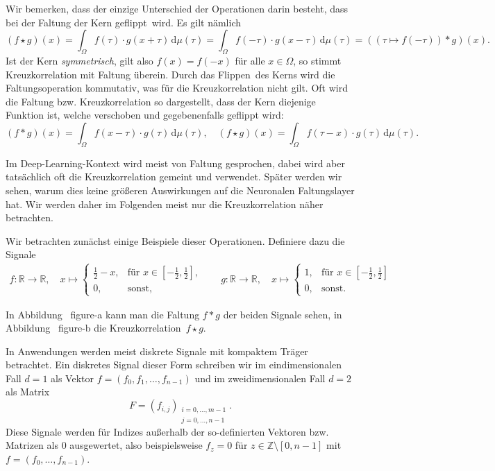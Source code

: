\documentclass{article}
\theoremstyle{definition}
\newcommand{\R}{\mathbb{R}}
\newcommand{\Z}{\mathbb{Z}}
\newcommand{\diff}{\,\textrm{d}}
\newcommand{\todo}[1]{{\color{red} #1}}
\begin{document}
Wir bemerken, dass der einzige Unterschied der Operationen darin besteht, dass bei der Faltung der Kern \glqq geflippt\grqq\ wird.
Es gilt nämlich \[
    \left(f \star g\right)(x) = \int_{\Omega} f(\tau) \cdot g(x+\tau) \diff\mu(\tau) = \int_\Omega f(-\tau) \cdot g(x - \tau) \diff\mu(\tau) = \left((\tau\mapsto f(-\tau)) * g\right)(x).
    \]
Ist der Kern \emph{symmetrisch}, gilt also $f(x) = f(-x)$ für alle $x\in\Omega$, so stimmt Kreuzkorrelation mit Faltung überein.
Durch das \glqq Flippen\grqq\ des Kerns wird die Faltungsoperation kommutativ, was für die Kreuzkorrelation nicht gilt.
Oft wird die Faltung bzw. Kreuzkorrelation so dargestellt, dass der Kern diejenige Funktion ist, welche verschoben und gegebenenfalls geflippt wird:
\[
    (f*g)(x) = \int_\Omega f(x - \tau) \cdot g(\tau)\diff\mu(\tau), \quad
    (f\star g)(x) = \int_\Omega f(\tau - x) \cdot g(\tau) \diff\mu(\tau).
\]

Im Deep-Learning-Kontext wird meist von Faltung gesprochen, dabei wird aber tatsächlich oft die Kreuzkorrelation gemeint und verwendet.
\todo{Später werden wir sehen, warum dies keine größeren Auswirkungen auf die Neuronalen Faltungslayer hat.}
Wir werden daher im Folgenden meist nur die Kreuzkorrelation näher betrachten.

Wir betrachten zunächst einige Beispiele dieser Operationen.
Definiere dazu die Signale
\begin{align*}
    f: \R \rightarrow \R, \quad x \mapsto \begin{cases}
        \frac{1}{2} - x, & \text{für $x\in[-\frac{1}{2},\frac{1}{2}]$,}\\
        0, & \text{sonst,}
    \end{cases} \qquad
    g: \R \rightarrow \R,\quad x \mapsto \begin{cases}
        1,& \text{für $x \in [-\frac{1}{2},\frac{1}{2}]$}\\
        0, & \text{sonst.}
    \end{cases}
\end{align*}

In Abbildung~\todo{figure-a} kann man die Faltung $f * g$ der beiden Signale sehen, in Abbildung~\todo{figure-b} die Kreuzkorrelation~$f\star g$.


In Anwendungen werden meist diskrete Signale mit kompaktem Träger betrachtet.
Ein diskretes Signal dieser Form schreiben wir im eindimensionalen Fall $d=1$ als Vektor $f = (f_0, f_1, \dots, f_{n-1})$ und im zweidimensionalen Fall $d=2$ als Matrix $$F = (f_{i,j})_{\substack{i=0,\dots,m-1\\ j=0,\dots, n-1}}.$$
Diese Signale werden für Indizes außerhalb der so-definierten Vektoren bzw. Matrizen als $0$ ausgewertet, also beispielsweise $f_z = 0$ für $z\in\Z\setminus[0,n-1]$ mit $f=(f_0, \dots, f_{n-1})$.
\end{document}

